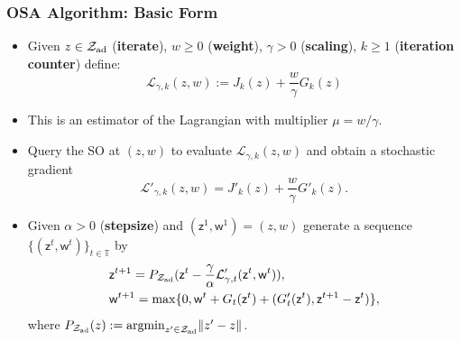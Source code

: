 \documentclass[aspectratio=169,xcolor=dvipsnames,11pt]{beamer}
\newcommand{\argmin}{\mathop{\mathrm{argmin}}}
\newcommand{\eqdef}{:=}
\DeclarePairedDelimiter{\inner}{(}{)}
\DeclarePairedDelimiter{\norm}{\lVert}{\rVert}
\newcommand{\setZ}{\mathcal{Z}}
\newcommand{\feas}{\setZ_{\rm ad}}
\newcommand{\scrL}{\mathcal{L}}
\newcommand{\scrP}{\mathcal{P}}
\newcommand{\con}{\mathsf{z}}
\newcommand{\pen}{\mathsf{w}}
\newcommand{\T}{\mathbb{T}}
\begin{document}
\begin{footnotesize}
\begin{frame}\frametitle{OSA Algorithm: Basic Form}
\begin{block}{}
\begin{itemize}
\item Given $z\in\feas$ (\textbf{iterate}), $w \ge 0$ (\textbf{weight}), $\gamma > 0$ (\textbf{scaling}), $k \ge 1$ (\textbf{iteration counter}) define:
\begin{equation}\label{eq:functionestimator}
\scrL_{\gamma,k}(z,w)\eqdef J_{k}(z)+\frac{w}{\gamma}G_{k}(z)
\end{equation}
\item This is an estimator of the Lagrangian with multiplier $\mu = w/\gamma$.\pause
\item Query the SO at $(z,w)$ to evaluate $\scrL_{\gamma,k}(z,w)$ and obtain a stochastic gradient
\begin{equation}\label{eq:gradestimator}
\scrL'_{\gamma,k}(z,w)=J'_{k}(z)+\frac{w}{\gamma}G'_{k}(z).
\end{equation}
\item \pause
Given $\alpha > 0$ (\textbf{stepsize}) and $(\con^{1},\pen^{1}) = (z,w)$ generate a sequence $\{(\con^t,\pen^t)\}_{t \in \T}$ by
 \begin{align*}
&\con^{t+1}=P_{\feas}(\con^{t}-\frac{\gamma}{\alpha}\scrL'_{\gamma,t}(\con^{t},\pen^{t})),\\
&\pen^{t+1}=\max\{0,\pen^{t}+G_{t}(\con^{t})+\inner{G'_{t}(\con^{t}),\con^{t+1}-\con^{t}}\},
\end{align*}
where $P_{\feas}(z)\eqdef\argmin_{z'\in\feas}\norm{z'-z}$. 
\end{itemize}
\end{block}
\end{frame}


\end{footnotesize}
\end{document}
